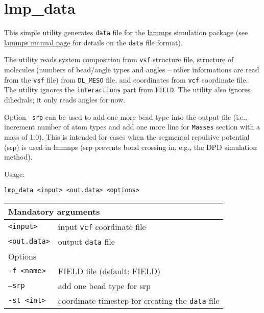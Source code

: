 \section{lmp\_data} \label{sec:lmp_data}

This simple utility generates \texttt{data} file for the
\href{https://lammps.sandia.gov/}{lammps} simulation package (see
\href{https://lammps.sandia.gov/doc/read_data.html}{lammps manual page} for
details on the \texttt{data} file format).

The utility reads system composition from \texttt{vsf} structure file,
structure of molecules (numbers of bead/angle types and angles -- other
informations are read from the \texttt{vsf} file) from \texttt{DL\_MESO}
file, and coordinates from \texttt{vcf} coordinate file.  The utility
ignores the \texttt{interactions} part from \texttt{FIELD}. The utility
also ignores dihedrals; it only reads angles for now.

Option \texttt{--srp} can be used to add one more bead type into the output
file (i.e., increment number of atom types and add one more line for
\texttt{Masses} section with a mass of 1.0). This is intended for cases
when the segmental repulsive potential (srp) is used in lammps (srp
prevents bond crossing in, e.g., the DPD simulation method).

Usage:

\vspace{1em}
\noindent
\texttt{lmp\_data <input> <out.data> <options>}

\noindent
\begin{longtable}{p{}p{}}
  \toprule
  \multicolumn{2}{l}{Mandatory arguments} \\
  \midrule
  \texttt{<input>} & input \texttt{vcf} coordinate file \\
  \texttt{<out.data>} & output \texttt{data} file \\
  \toprule
  \multicolumn{2}{l}{Options} \\
  \midrule
  \texttt{-f <name>} & FIELD file (default: FIELD)\\
  \texttt{--srp} & add one bead type for srp\\
  \texttt{-st <int>} & coordinate timestep for creating the \texttt{data}
  file \\
  \bottomrule
\end{longtable}
